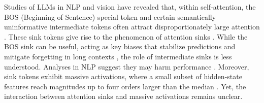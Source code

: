 \documentclass{article}
\begin{document}

Studies of LLMs in NLP and vision have revealed that, within self-attention, the BOS (Beginning of Sentence) special token and certain semantically uninformative intermediate tokens often attract disproportionately large attention \cite{xiao2023streamingllm, gu2024attention, yu2024unveiling, cancedda2024spectral, barbero2025llms, qiu2025gated}. These sink tokens give rise to the phenomenon of attention sinks \cite{xiao2023streamingllm}. While the BOS sink can be useful, acting as key biases that stabilize predictions \cite{gu2024attention} and mitigate forgetting in long contexts \cite{xiao2023streamingllm}, the role of intermediate sinks is less understood. Analyses in NLP suggest they may harm performance \cite{yu2024unveiling}. Moreover, sink tokens exhibit massive activations, where a small subset of hidden-state features reach magnitudes up to four orders larger than the median \cite{sun2024massive, owen2025refined, kaul2024attention}. Yet, the interaction between attention sinks and massive activations remains unclear.


\end{document}
